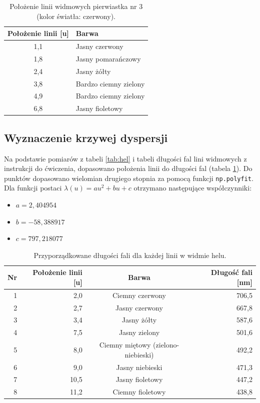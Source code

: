 \documentclass[a4paper,12pt]{article}
\begin{document}
\begin{table}[H]
    \centering
    \begin{tabular}{|c|l|}
        \hline
        Położenie linii [u] & Barwa \\ \hline
        1{,}1 & Jasny czerwony \\ \hline
        1{,}8 & Jasny pomarańczowy \\ \hline
        2{,}4 & Jasny żółty \\ \hline
        3{,}8 & Bardzo ciemny zielony \\ \hline
        4{,}9 & Bardzo ciemny zielony \\ \hline
        6{,}8 & Jasny fioletowy \\ \hline
    \end{tabular}
    \caption{Położenie linii widmowych pierwiastka nr 3 (kolor światła: czerwony).}
\end{table}

\subsection{Wyznaczenie krzywej dyspersji}

Na podstawie pomiarów z tabeli \ref{tab:hel} i tabeli długości fal lini widmowych z instrukcji do ćwiczenia, dopasowano położenia linii do długości fal (tabela \ref{tab:hel_dispersion}). Do punktów dopasowano wielomian drugiego stopnia za pomocą funkcji \texttt{np.polyfit}. Dla funkcji postaci $\lambda(u) = au^2 + bu + c$ otrzymano następujące współczynniki:
\begin{itemize}
    \item $a = 2{,}404954$
    \item $b = -58{,}388917$
    \item $c = 797{,}218077$
\end{itemize}

\begin{table}[H]
    \centering
    \begin{tabular}{|r|r|c|r|}
        \hline
        Nr & Położenie linii [u] & Barwa  & Długość fali [nm] \\ \hline
        1 & 2{,}0 & Ciemny czerwony & 706,5  \\ \hline
        2 & 2{,}7 & Jasny czerwony & 667,8\\ \hline
        3 & 3{,}4 & Jasny żółty & 587,6 \\ \hline
        4 & 7{,}5 & Jasny zielony & 501,6 \\ \hline
        5 & 8{,}0 & Ciemny miętowy (zielono-niebieski) & 492,2\\ \hline
        6 & 9{,}0 & Jasny niebieski & 471,3 \\ \hline
        7 & 10{,}5 & Jasny fioletowy & 447,2 \\ \hline
        8 & 11{,}2 & Ciemny fioletowy & 438,8 \\ \hline
    \end{tabular}
    \caption{Przyporządkowane długości fali dla każdej linii w widmie helu.}
    \label{tab:hel_dispersion}
\end{table}
\end{document}
